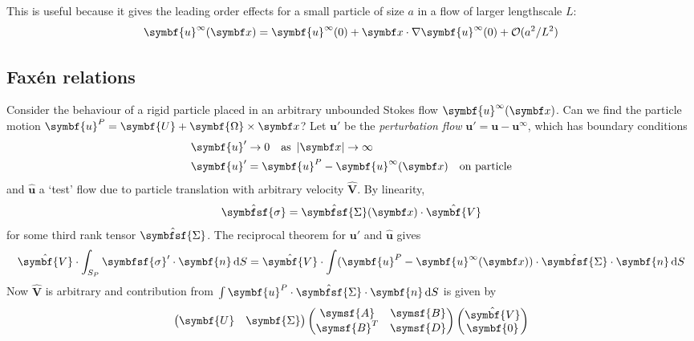 \documentclass{jknotes}
\begin{document}
This is useful because it gives the leading order effects for a small particle
of size $a$ in a flow of larger lengthscale $L$:
\begin{equation}
	\symbf{u}^\infty(\x) = \symbf{u}^\infty(0) + \x \cdot \nabla \symbf{u}^\infty(0) +
	\mathcal{O}(a^2/L^2)
\end{equation}

\subsection{Fax\'{e}n relations}
Consider the behaviour of a rigid particle placed in an arbitrary unbounded
Stokes flow $\symbf{u}^\infty(\x)$. Can we find the particle motion $\symbf{u}^P =
\symbf{U} + \symbf{\Omega} \times \x$? Let $\symbf{u}'$ be the \emph{perturbation flow}
$\symbf{u}' = \symbf{u} - \symbf{u}^\infty$, which has boundary conditions
\begin{align}
	\symbf{u}' &\to 0 \hspace{1em} \text{as} \,\,\, \abs{\x} \to \infty \\
	\symbf{u}' &= \symbf{u}^P - \symbf{u}^\infty(\x) \hspace{1em} \text{on particle}
\end{align}
and $\hat{\symbf{u}}$ a `test' flow due to particle translation with arbitrary
velocity $\hat{\symbf{V}}$. By linearity, 
\begin{equation}
	\hat{\symbfsf{\sigma}} = \hat{\symbfsf{\Sigma}}(\x) \cdot
	\hat{\symbf{V}}
\end{equation}
for some third rank tensor $\hat{\symbfsf{\Sigma}}$. The reciprocal theorem for
$\symbf{u}'$ and $\hat{\symbf{u}}$ gives
\begin{equation}
	\hat{\symbf{V}} \cdot \int_{S_P} \symbfsf{\sigma}' \cdot \symbf{n}\,\diffd S =
	\hat{\symbf{V}} \cdot \int (\symbf{u}^P - \symbf{u}^\infty(\x))\cdot
	\hat{\symbfsf{\Sigma}} \cdot \symbf{n}\,\diffd S
\end{equation}
Now $\hat{\symbf{V}}$ is arbitrary and contribution from $\int \symbf{u}^P \cdot
\hat{\symbfsf{\Sigma}}\cdot\symbf{n}\,\diffd S$ is given by
\begin{equation}
\begin{pmatrix} \symbf{U} & \symbf{\Sigma}\end{pmatrix} \begin{pmatrix} \symsf{A} &
\symsf{B} \\ \symsf{B}^T & \symsf{D} \end{pmatrix} \begin{pmatrix}
\hat{\symbf{V}} \\ \symbf{0} \end{pmatrix}
\end{equation}
\end{document}
